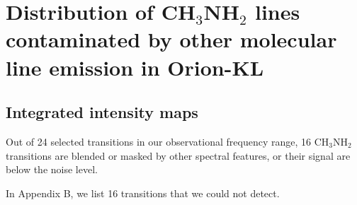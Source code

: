\chapter{Distribution of CH$_{3}$NH$_{2}$ lines contaminated by other molecular line emission in Orion-KL
\label{chap:appendixB}}

\section{Integrated intensity maps}
Out of 24 selected transitions in our observational frequency range, 16 CH$_{3}$NH$_{2}$ transitions are 
blended or masked by other spectral features, or their signal are below the noise level.

In Appendix B, we list 16 transitions that we could not detect.
\newpage

